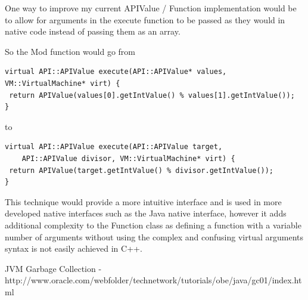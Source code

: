 \documentclass[]{final_report}
\begin{document}
One way to improve my current APIValue / Function implementation would be to allow for arguments in the execute function to be passed as they would in native code instead of passing them as an array.

So the Mod function would go from
\begin{verbatim}
virtual API::APIValue execute(API::APIValue* values, VM::VirtualMachine* virt) {
 return APIValue(values[0].getIntValue() % values[1].getIntValue());
}
\end{verbatim}
to
\begin{verbatim}
virtual API::APIValue execute(API::APIValue target, 
    API::APIValue divisor, VM::VirtualMachine* virt) {
 return APIValue(target.getIntValue() % divisor.getIntValue());
}
\end{verbatim}

This technique would provide a more intuitive interface and is used in more developed native interfaces such as the Java native interface, however it adds additional complexity to the Function class as defining a function with a variable number of arguments without using the complex and confusing virtual arguments syntax is not easily achieved in C++.

\newpage
\begin{thebibliography}{99}
JVM Garbage Collection - http://www.oracle.com/webfolder/technetwork/tutorials/obe/java/gc01/index.html
\end{thebibliography}
\label{endpage}
\end{document}
